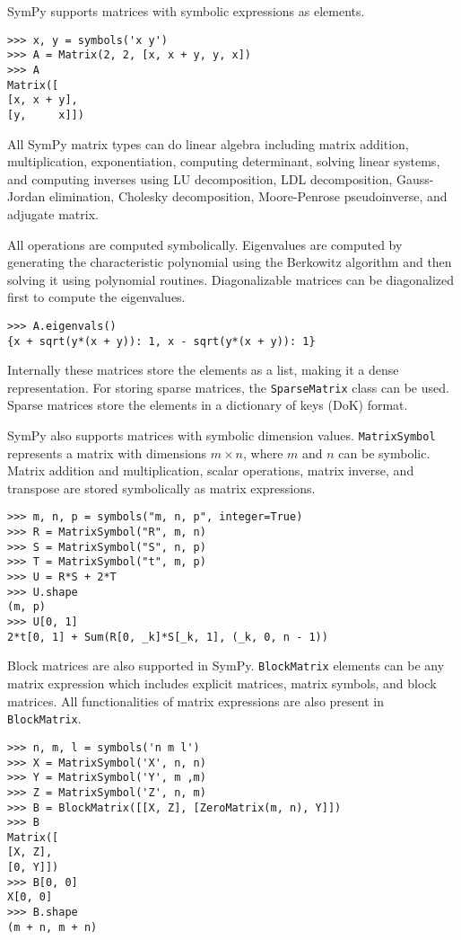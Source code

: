SymPy supports matrices with symbolic expressions as elements.

\begin{verbatim}
>>> x, y = symbols('x y')
>>> A = Matrix(2, 2, [x, x + y, y, x])
>>> A
Matrix([
[x, x + y],
[y,     x]])

\end{verbatim}

All SymPy matrix types can do linear algebra including matrix addition,
multiplication, exponentiation, computing determinant, solving linear systems,
and computing inverses using LU decomposition, LDL decomposition, Gauss-Jordan
elimination, Cholesky decomposition, Moore-Penrose pseudoinverse, and adjugate
matrix.

All operations are computed symbolically. Eigenvalues are computed by generating
the characteristic polynomial using the Berkowitz algorithm and then solving it
using polynomial routines. Diagonalizable matrices can be diagonalized first to
compute the eigenvalues.
\begin{verbatim}
>>> A.eigenvals()
{x + sqrt(y*(x + y)): 1, x - sqrt(y*(x + y)): 1}

\end{verbatim}

Internally these matrices store the elements as a list, making it a dense
representation. For storing sparse matrices, the \verb|SparseMatrix| class can
be used. Sparse matrices store the elements in a dictionary of keys (DoK)
format.

SymPy also supports matrices with symbolic dimension values. \verb|MatrixSymbol|
represents a matrix with dimensions $m\times n$, where $m$ and $n$ can be
symbolic. Matrix addition and multiplication, scalar operations, matrix inverse,
and transpose are stored symbolically as matrix expressions.
\begin{verbatim}
>>> m, n, p = symbols("m, n, p", integer=True)
>>> R = MatrixSymbol("R", m, n)
>>> S = MatrixSymbol("S", n, p)
>>> T = MatrixSymbol("t", m, p)
>>> U = R*S + 2*T
>>> U.shape
(m, p)
>>> U[0, 1]
2*t[0, 1] + Sum(R[0, _k]*S[_k, 1], (_k, 0, n - 1))

\end{verbatim}

Block matrices are also supported in SymPy. \verb|BlockMatrix| elements can be any
matrix expression which includes explicit matrices, matrix symbols, and block
matrices. All functionalities of matrix expressions are also present in
\verb|BlockMatrix|.


\begin{verbatim}
>>> n, m, l = symbols('n m l')
>>> X = MatrixSymbol('X', n, n)
>>> Y = MatrixSymbol('Y', m ,m)
>>> Z = MatrixSymbol('Z', n, m)
>>> B = BlockMatrix([[X, Z], [ZeroMatrix(m, n), Y]])
>>> B
Matrix([
[X, Z],
[0, Y]])
>>> B[0, 0]
X[0, 0]
>>> B.shape
(m + n, m + n)

\end{verbatim}
